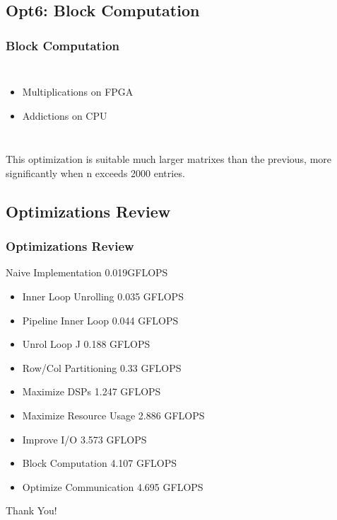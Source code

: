 \documentclass{beamer}
\begin{document}
\begin{frame}
\subsection{Opt6: Block Computation}
\frametitle{Block Computation}

\begin{columns}[c]



\begin{itemize}
\item Multiplications on FPGA
\item Addictions on CPU
\end{itemize}
\end{columns}

This optimization is suitable much larger matrixes than the previous, more significantly when n exceeds 2000 entries.

\end{frame}
\begin{frame}
\subsection{Optimizations Review}
\frametitle{Optimizations Review}
Naive Implementation 0.019GFLOPS
\begin{itemize}
\item Inner Loop Unrolling 0.035 GFLOPS
\item Pipeline Inner Loop 0.044 GFLOPS
\item Unrol Loop J 0.188 GFLOPS
\item Row/Col Partitioning 0.33 GFLOPS
\item Maximize DSPs 1.247 GFLOPS
\item Maximize Resource Usage 2.886 GFLOPS
\item Improve I/O 3.573 GFLOPS
\item Block Computation 4.107 GFLOPS
\item Optimize Communication 4.695 GFLOPS
\end{itemize}
\end{frame}
\begin{frame}
Thank You!

\end{frame}
\end{document}
